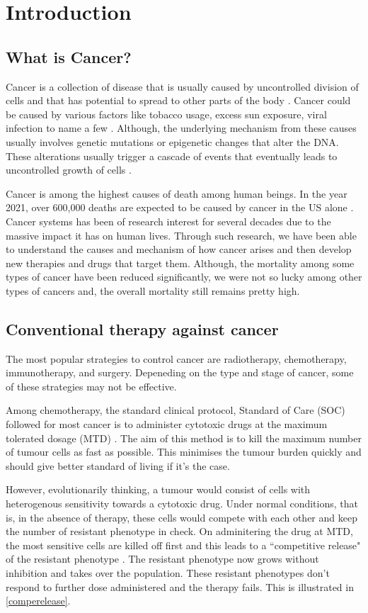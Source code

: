 \chapter{Introduction}

\section{What is Cancer?}
Cancer is a collection of disease that is usually caused by uncontrolled division of cells and that has potential to spread to other parts of the body \cite{cancergov}. Cancer could be caused by various factors like tobacco usage, excess sun exposure, viral infection to name a few \cite{Trichopoulos}. Although, the underlying mechanism from these causes usually involves genetic mutations or epigenetic changes that alter the DNA. These alterations usually trigger a cascade of events that eventually leads to uncontrolled growth of cells \cite{Moolgavkar,Gronbaek}.

Cancer is among the highest causes of death among human beings. In the year 2021, over 600,000 deaths are expected to be caused by cancer in the US alone \cite{cancer_stats}. Cancer systems has been of research interest for several decades due to the massive impact it has on human lives. Through such research, we have been able to understand the causes and mechanism of how cancer arises and then develop new therapies and drugs that target them. Although, the mortality among some types of cancer have been reduced significantly, we were not so lucky among other types of cancers and, the overall mortality still remains pretty high.

\section{Conventional therapy against cancer}
The most popular strategies to control cancer are radiotherapy, chemotherapy, immunotherapy, and surgery. Depeneding on the type and stage of cancer, some of these strategies may not be effective.

Among chemotherapy, the standard clinical protocol, Standard of Care (SOC) followed for most cancer is to administer cytotoxic drugs at the maximum tolerated dosage (MTD) \cite{Frei}. The aim of this method is to kill the maximum number of tumour cells as fast as possible. This minimises the tumour burden quickly and should give better standard of living if it's the case.

However, evolutionarily thinking, a tumour would consist of cells with heterogenous sensitivity towards a cytotoxic drug. Under normal conditions, that is, in the absence of therapy, these cells would compete with each other and keep the number of resistant phenotype in check. On adminitering the drug at MTD, the most sensitive cells are killed off first and this leads to a ``competitive release" of the resistant phenotype \cite{Scott}. The resistant phenotype now grows without inhibition and takes over the population. These resistant phenotypes don't respond to further dose administered and the therapy fails. This is illustrated in \autoref{comperelease}.

